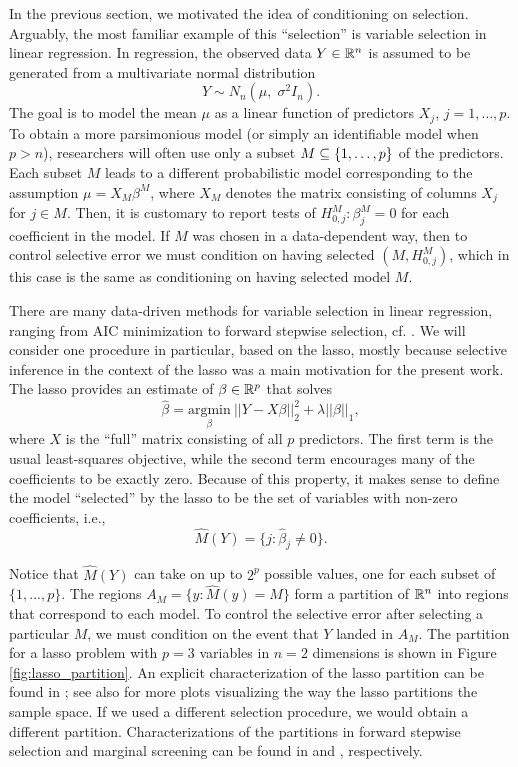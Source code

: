\documentclass{article}
\theoremstyle{definition}
\newcommand{\bX}{X}
\newcommand{\hM}{\widehat{M}}
\begin{document}
In the previous section, we motivated the idea of conditioning on selection. Arguably, the most familiar example of this ``selection'' is variable selection in linear regression. In regression, the observed data $Y \in \mathbb{R}^n$ is assumed to be generated from a multivariate normal distribution
\begin{equation}\label{eq:fullModel}
  Y \sim N_n(\mu, \;\sigma^2 I_n).
\end{equation}
The goal is to model the mean $\mu$ as a linear function of predictors $X_j$, $j=1,\ldots, p$. To obtain a more parsimonious model (or simply an identifiable model when $p > n$), researchers will often use only a subset $M \subseteq\{1,\ldots, p \}$ of the predictors. Each subset $M$ leads to a different probabilistic model corresponding to the assumption $\mu=\bX_M \beta^{M}$, where $\bX_M$ denotes the matrix consisting of columns $X_j$ for $j\in M$. Then, it is customary to report tests of $H_{0,j}^M: \beta^M_j = 0$ for each coefficient in the model. If $M$ was chosen in a data-dependent way, then to control selective error we must condition on having selected $(M, H_{0,j}^M)$, which in this case is the same as conditioning on having selected model $M$.

There are many data-driven methods for variable selection in linear regression, ranging from AIC minimization to forward stepwise selection, cf. \citet{hastie2009elements}. We will consider one procedure in particular, based on the lasso, mostly because selective inference in the context of the lasso \citep{lee2013exact} was a main motivation for the present work. The lasso \citep{tibshirani1996regression} provides an estimate of $\beta \in \mathbb{R}^p$ that solves
\begin{equation}
\hat\beta = \underset{\beta}{\text{argmin}}\ ||Y - X\beta||_2^2 + \lambda ||\beta||_1,
\end{equation}
where $X$ is the ``full'' matrix consisting of all $p$ predictors. The first term is the usual least-squares objective, while the second term encourages many of the coefficients to be exactly zero. Because of this property, it makes sense to define the model ``selected'' by the lasso to be the set of variables with non-zero coefficients, i.e.,
\[ \hM(Y) = \{ j: \hat\beta_j \neq 0 \}. \]

Notice that $\hM(Y)$ can take on up to $2^p$ possible values, one for each subset of $\{1, ..., p\}$. The regions $A_M = \{y: \hM(y) = M\}$ form a partition of $\mathbb{R}^n$ into regions that correspond to each model. To control the selective error after selecting a particular $M$, we must condition on the event that $Y$ landed in $A_M$. The partition for a lasso problem with $p=3$ variables in $n=2$ dimensions is shown in Figure \ref{fig:lasso_partition}. An explicit characterization of the lasso partition can be found in \citet{lee2013exact}; see also \citet{harris2014visualizing} for more plots visualizing the way the lasso partitions the sample space. If we used a different selection procedure, we would obtain a different partition. Characterizations of the partitions in forward stepwise selection and marginal screening can be found in \citet{loftus2014significance} and \citet{lee2014marginal}, respectively.
\end{document}
